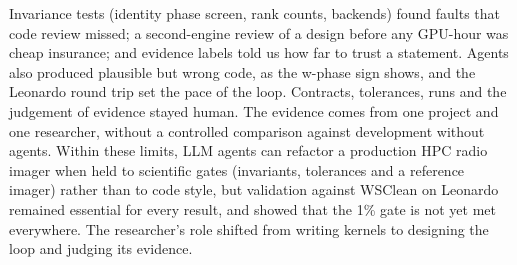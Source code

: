 \documentclass[11pt,twoside]{article}
\begin{document}
Invariance tests (identity phase screen, rank counts, backends) found faults
that code review missed; a second-engine review of a design before any
GPU-hour was cheap insurance; and evidence labels told us how far to trust a
statement. Agents also produced plausible but wrong code, as the w-phase sign
shows, and the Leonardo round trip set the pace of the loop. Contracts,
tolerances, runs and the judgement of evidence stayed human. The evidence
comes from one project and one researcher, without a controlled comparison
against development without agents. Within these limits, LLM agents can
refactor a production HPC radio imager when held to scientific gates
(invariants, tolerances and a reference imager) rather than to code style, but
validation against WSClean on Leonardo remained essential for every result, and showed that the 1\% gate is not yet met everywhere. The researcher's role shifted from writing kernels to designing the
loop and judging its evidence.



\end{document}

